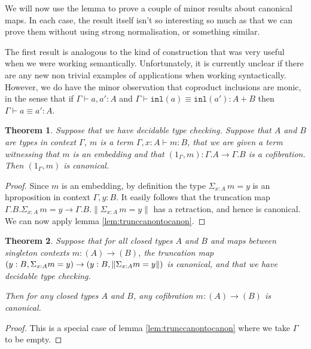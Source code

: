 \documentclass[a4paper]{amsart}
\newtheorem{theorem}{Theorem}[section]
\theoremstyle{definition}
\newtheorem{definition}[theorem]{Definition}
\newcommand{\transit}{\operatorname{Transitive}}
\newcommand{\isequiv}{\operatorname{IsEquiv}}
\begin{document}
We will now use the lemma to prove a couple of minor results about
canonical maps. In each case, the result itself isn't so interesting
so much as that we can prove them without using strong normalisation,
or something similar.

The first result is analogous to the kind of construction that was
very useful when we were working semantically. Unfortunately,
it is currently unclear if there are any new non trivial examples of
applications when working syntactically. However, we do have the minor
observation that coproduct inclusions are monic, in the sense that if
$\Gamma \vdash a, a' : A$ and $\Gamma \vdash \mathtt{inl}(a) \equiv
\mathtt{inl}(a') : A + B$ then $\Gamma \vdash a \equiv a' : A$.

\begin{theorem}
  Suppose that we have decidable type checking. Suppose that $A$ and
  $B$ are types in context $\Gamma$, $m$ is a term
  $\Gamma, x : A \vdash m : B$, that we are given a term witnessing
  that $m$ is an embedding and that
  $(1_\Gamma, m) \colon \Gamma.A \to \Gamma.B$ is a cofibration. Then
  $(1_\Gamma, m)$ is canonical.
\end{theorem}
\begin{proof}
  Since $m$ is an embedding, by definition the type
  $\Sigma_{x : A}\,m = y$ is an hproposition in context
  $\Gamma, y : B$. It easily follows that the truncation map
  $\Gamma.B.\Sigma_{x : A}\,m = y \to \Gamma.B.\|\Sigma_{x : A}\,m =
  y\|$ has a retraction, and hence is canonical. We can now apply
  lemma \ref{lem:trunccanontocanon}.
\end{proof}

\begin{theorem}
  \label{thm:trunccanontocanonclosed}
  Suppose that for all closed types $A$ and $B$ and maps between
  singleton contexts $m \colon (A) \to (B)$, the truncation map
  $(y : B, \Sigma_{x : A} m = y) \to (y : B, \| \Sigma_{x : A} m = y \|)$ is
  canonical, and that we have decidable type checking.

  Then for any closed types $A$ and $B$, any cofibration
  $m \colon (A) \to (B)$ is canonical.
\end{theorem}

\begin{proof}
  This is a special case of lemma \ref{lem:trunccanontocanon} where we
  take $\Gamma$ to be empty.
\end{proof}


\end{document}
